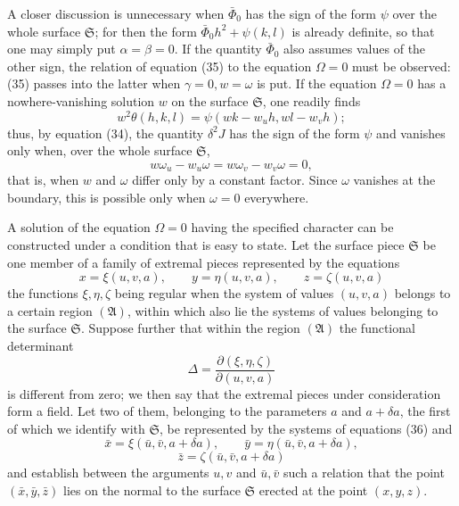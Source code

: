 \documentclass[11pt,a4paper,leqno]{article}
\begin{document}
A closer discussion is unnecessary when $\bar\Phi_0$ has the sign of the form
$\psi$ over the whole surface $\mathfrak{S}$; for then the form
$\bar\Phi_0h^2+\psi(k,l)$ is already definite, so that one may simply put
$\alpha=\beta=0$. If the quantity $\bar\Phi_0$ also assumes values of the
other sign, the relation of equation (35) to the equation $\Omega=0$ must be
observed: (35) passes into the latter when $\gamma=0,w=\omega$ is put. If the
equation $\Omega=0$ has a nowhere-vanishing solution $w$ on the surface
$\mathfrak{S}$, one readily finds
\[
w^2\theta(h,k,l)=\psi(wk-w_uh,wl-w_vh);
\]
thus, by equation (34), the quantity $\delta^2J$ has the sign of the form
$\psi$ and vanishes only when, over the whole surface $\mathfrak{S}$,
\[
w\omega_u-w_u\omega=w\omega_v-w_v\omega=0,
\]
that is, when $w$ and $\omega$ differ only by a constant factor. Since
$\omega$ vanishes at the boundary, this is possible only when $\omega=0$
everywhere.

A solution of the equation $\Omega=0$ having the specified character can be
constructed under a condition that is easy to state. Let the surface piece
$\mathfrak{S}$ be one member of a family of extremal pieces represented by
the equations
\begin{equation}\tag{36}
x=\xi(u,v,a),\qquad y=\eta(u,v,a),\qquad z=\zeta(u,v,a)
\end{equation}
the functions $\xi,\eta,\zeta$ being regular when the system of values
$(u,v,a)$ belongs to a certain region $(\mathfrak{A})$, within which also
lie the systems of values belonging to the surface $\mathfrak{S}$. Suppose
further that within the region $(\mathfrak{A})$ the functional determinant
\[
\Delta=\frac{\partial(\xi,\eta,\zeta)}{\partial(u,v,a)}
\]
is different from zero; we then say that the extremal pieces under
consideration form a field. Let two of them, belonging to the parameters $a$
and $a+\delta a$, the first of which we identify with $\mathfrak{S}$, be
represented by the systems of equations (36) and
\[
\bar x=\xi(\bar u,\bar v,a+\delta a),\qquad
\bar y=\eta(\bar u,\bar v,a+\delta a),
\]
\[
\bar z=\zeta(\bar u,\bar v,a+\delta a)
\]
and establish between the arguments $u,v$ and $\bar u,\bar v$ such a
relation that the point $(\bar x,\bar y,\bar z)$ lies on the normal to the
surface $\mathfrak{S}$ erected at the point $(x,y,z)$.
\end{document}

